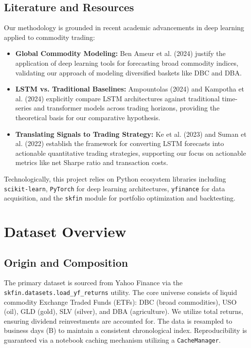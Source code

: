 \documentclass[a4paper,oneside]{scrbook}
\begin{document}
\subsection{Literature and Resources}
Our methodology is grounded in recent academic advancements in deep learning applied to commodity trading:
\begin{itemize}
    \item \textbf{Global Commodity Modeling:} Ben Ameur et al. (2024) justify the application of deep learning tools for forecasting broad commodity indices, validating our approach of modeling diversified baskets like DBC and DBA.
    \item \textbf{LSTM vs. Traditional Baselines:} Ampountolas (2024) and Kampotha et al. (2024) explicitly compare LSTM architectures against traditional time-series and transformer models across trading horizons, providing the theoretical basis for our comparative hypothesis.
    \item \textbf{Translating Signals to Trading Strategy:} Ke et al. (2023) and Suman et al. (2022) establish the framework for converting LSTM forecasts into actionable quantitative trading strategies, supporting our focus on actionable metrics like net Sharpe ratio and transaction costs.
\end{itemize}
Technologically, this project relies on Python ecosystem libraries including \texttt{scikit-learn}, \texttt{PyTorch} for deep learning architectures, \texttt{yfinance} for data acquisition, and the \texttt{skfin} module for portfolio optimization and backtesting.

\section{Dataset Overview}

\subsection{Origin and Composition}
The primary dataset is sourced from Yahoo Finance via the \texttt{skfin.datasets.load\_yf\_returns} utility. The core universe consists of liquid commodity Exchange Traded Funds (ETFs): DBC (broad commodities), USO (oil), GLD (gold), SLV (silver), and DBA (agriculture). We utilize total returns, ensuring dividend reinvestments are accounted for. The data is resampled to business days (B) to maintain a consistent chronological index. Reproducibility is guaranteed via a notebook caching mechanism utilizing a \texttt{CacheManager}.
\end{document}

